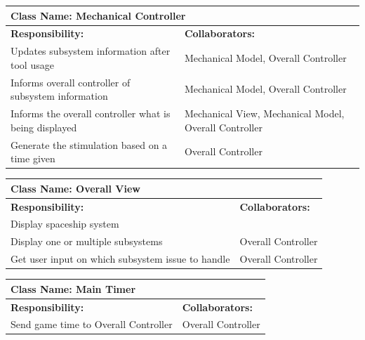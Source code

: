 \documentclass[12pt, titlepage]{article}
\begin{document}
\begin{enumerate}[a)]
	\begin{table}[H]
		\centering
		\begin{tabular}{|p{10cm}|p{5cm}|}
		\hline 
		 \multicolumn{2}{|l|}{\textbf{Class Name: Mechanical Controller}} \\
		\hline
		\textbf{Responsibility:} & \textbf{Collaborators:} \\
		\hline
		Updates subsystem information after tool usage & Mechanical Model, Overall Controller\\
		\hline
		 Informs overall controller of subsystem information & Mechanical Model, Overall Controller\\
		\hline
		 Informs the overall controller what is being displayed & Mechanical View, Mechanical Model, Overall Controller\\
		\hline
		 Generate the stimulation based on a time given & Overall Controller \\
		\hline
		\end{tabular}
	\end{table}

	\begin{table}[H]
		\centering
		\begin{tabular}{|p{10cm}|p{5cm}|}
		\hline 
		 \multicolumn{2}{|l|}{\textbf{Class Name: Overall View}} \\
		\hline
		\textbf{Responsibility:} & \textbf{Collaborators:} \\
		\hline
		 Display spaceship system & \\
		\hline
		Display one or multiple subsystems & Overall Controller\\
		\hline
		Get user input on which subsystem issue to handle & Overall Controller \\
		\hline
		\end{tabular}
	\end{table}

	\begin{table}[H]
		\centering
		\begin{tabular}{|p{10cm}|p{5cm}|}
		\hline 
		 \multicolumn{2}{|l|}{\textbf{Class Name: Main Timer}} \\
		\hline
		\textbf{Responsibility:} & \textbf{Collaborators:} \\
		\hline
		 Send game time to Overall Controller & Overall Controller\\
		\hline
		\end{tabular}
	\end{table}


\end{enumerate}
\end{document}
